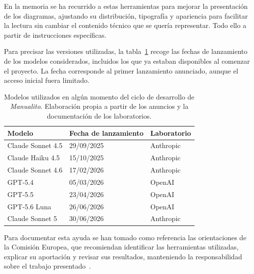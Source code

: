 En la memoria se ha recurrido a estas herramientas para mejorar la presentación
de los diagramas, ajustando su distribución, tipografía y apariencia para
facilitar la lectura sin cambiar el contenido técnico que se quería
representar. Todo ello a partir de instrucciones específicas.

Para precisar las versiones utilizadas, la tabla~\ref{tabla:aspectos-modelos-ia}
recoge las fechas de lanzamiento de los modelos considerados, incluidos
los que ya estaban disponibles al comenzar el proyecto. La fecha corresponde al
primer lanzamiento anunciado, aunque el acceso inicial fuera limitado.

\begin{table}[htbp]
    \centering
    \small
    \begin{tabular}{@{}p{}p{}p{}@{}}
        \toprule
        \textbf{Modelo} & \textbf{Fecha de lanzamiento} & \textbf{Laboratorio} \\
        \midrule
        Claude Sonnet 4.5 & 29/09/2025 & Anthropic~\cite{anthropic_sonnet45_lanzamiento} \\
        \addlinespace
        Claude Haiku 4.5 & 15/10/2025 & Anthropic~\cite{anthropic_haiku45_lanzamiento} \\
        \addlinespace
        Claude Sonnet 4.6 & 17/02/2026 & Anthropic~\cite{anthropic_sonnet46_lanzamiento} \\
        \addlinespace
        GPT-5.4 & 05/03/2026 & OpenAI~\cite{openai_gpt54_lanzamiento} \\
        \addlinespace
        GPT-5.5 & 23/04/2026 & OpenAI~\cite{openai_gpt55} \\
        \addlinespace
        GPT-5.6 Luna~\cite{openai_gpt56_luna} & 26/06/2026~\cite{openai_gpt56_previa} & OpenAI \\
        \addlinespace
        Claude Sonnet 5 & 30/06/2026 & Anthropic~\cite{anthropic_sonnet5_lanzamiento} \\
        \bottomrule
    \end{tabular}
    \caption{Modelos utilizados en algún momento del ciclo de desarrollo de \textit{Manualito}.
    Elaboración propia a partir de los anuncios y la documentación de los laboratorios.}
    \label{tabla:aspectos-modelos-ia}
\end{table}
\FloatBarrier

Para documentar esta ayuda se han tomado como referencia las orientaciones de
la Comisión Europea, que recomiendan identificar las herramientas
utilizadas, explicar su aportación y revisar sus resultados, manteniendo
la responsabilidad sobre el trabajo
presentado~\cite{comision_europea2026_ia_investigacion}.
